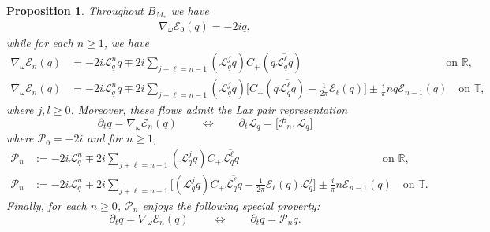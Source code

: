 \documentclass{amsart}
\numberwithin{equation}{section}
\newtheorem{proposition}[theorem]{Proposition}
\theoremstyle{definition}
\newcommand{\om}{\omega}
\newcommand{\R}{\mathbb{R}}
\newcommand{\T}{\mathbb{T}}
\newcommand{\E}{\mathcal{E}}
\newcommand{\Lc}{\mathcal{L}}
\newcommand{\na}{\nabla}
\newcommand{\dd}{\partial}
\begin{document}
\begin{proposition}\label{P:En flows}
Throughout $B_{M_*}$ we have 
\begin{align}\label{E0 symplectic deriv}
\na_\om\mathcal{E}_0(q)= -2iq,
\end{align}
while for each $n\geq1$, we have
\begin{equation}\label{En symplectic deriv}
\begin{aligned}
\na_\om\mathcal{E}_n(q)&=-2i\Lc_q^nq\mp2i\!\!\sum_{j+\ell=n-1}\!\!(\Lc_q^jq)C_+(q\overline{\Lc_q^\ell q}) \qquad\qquad\qquad\qquad\qquad\qquad\quad \text{on $\R$,}\\
\na_\om\mathcal{E}_n(q)&=-2i\Lc_q^nq\mp2i\sum_{j+\ell=n-1}(\Lc_q^j q)\bigl[C_+(q\overline{\Lc_q^\ell q})-\tfrac1{2\pi}\mathcal{E}_\ell(q)\bigr]\pm\tfrac{i}{\pi}nq\E_{n-1}(q)\quad \text{on $\T$,}
\end{aligned}
\end{equation}
where $j,l\geq 0$. Moreover, these flows admit the Lax pair representation
\begin{equation}
\dd_t q=\na_\om\mathcal{E}_n(q) \qquad \iff \qquad \dd_t \Lc_q = \bigl[\mathcal{P}_n,\Lc_q\bigr]\label{En Lax pair}
\end{equation}
where $\mathcal{P}_0=-2i$ and for $n\geq 1$,
\begin{equation}\label{eqn:Peter_op_n}
\begin{aligned}
\mathcal{P}_n&:=-2i\Lc_q^n\mp 2i\!\!\!\!\!\sum_{j+\ell=n-1}(\Lc_q^jq) C_+\overline{\Lc_q^\ell q} \qquad\qquad\qquad\qquad\qquad\qquad \quad\text{on $\R$,}\\
\mathcal{P}_n&:=-2i\Lc_q^n\mp 2i\!\!\!\!\!\sum_{j+\ell=n-1}\bigl[(\Lc_q^jq) C_+\overline{\Lc_q^\ell q}-\tfrac{1}{2\pi}\E_\ell(q)\Lc_q^j\bigr]\pm\tfrac{i}{\pi}n\E_{n-1}(q)\quad \text{on $\T$.}
\end{aligned}
\end{equation}
Finally, for each $n\geq 0$, $\mathcal{P}_n$ enjoys the following special property:
\begin{equation}
\dd_t q=\na_\om\mathcal{E}_n(q) \qquad \iff \qquad \dd_t q=\mathcal{P}_n q.\label{one true peter for En}
\end{equation}
\end{proposition}
\end{document}
